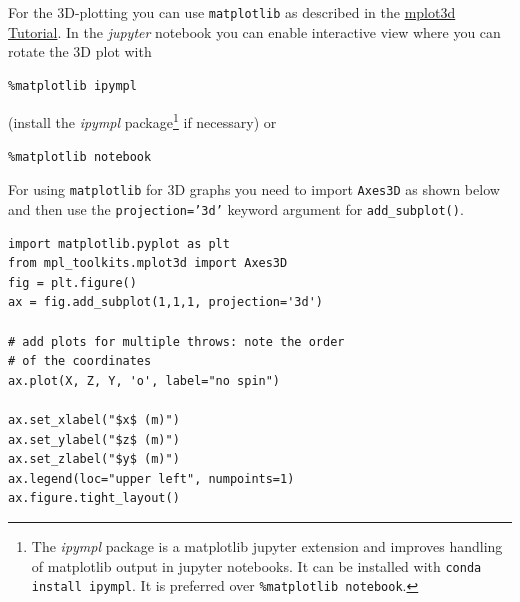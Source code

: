 \documentclass[letterpaper]{scrartcl}
\begin{document}
For the 3D-plotting you can use \texttt{matplotlib} as described in
the
\href{http://matplotlib.org/mpl_toolkits/mplot3d/tutorial.html}{mplot3d
  Tutorial}. In the \emph{jupyter} notebook you can enable
interactive view where you can rotate the 3D plot with
\begin{verbatim}
%matplotlib ipympl
\end{verbatim}
(install the \emph{ipympl} package\footnote{The \emph{ipympl} package
  is a matplotlib jupyter extension and improves handling of
  matplotlib output in jupyter notebooks. It can be installed with
  \texttt{conda install ipympl}. It is preferred over
  \texttt{\%matplotlib notebook}.} if necessary) or
\begin{verbatim}
%matplotlib notebook
\end{verbatim}
For using \texttt{matplotlib} for 3D graphs you need to import
\texttt{Axes3D} as shown below and then use the
\texttt{projection='3d'} keyword argument for \texttt{add\_subplot()}.
\begin{verbatim}
import matplotlib.pyplot as plt
from mpl_toolkits.mplot3d import Axes3D
fig = plt.figure()
ax = fig.add_subplot(1,1,1, projection='3d')

# add plots for multiple throws: note the order
# of the coordinates
ax.plot(X, Z, Y, 'o', label="no spin")

ax.set_xlabel("$x$ (m)")
ax.set_ylabel("$z$ (m)")
ax.set_zlabel("$y$ (m)")
ax.legend(loc="upper left", numpoints=1)
ax.figure.tight_layout()
\end{verbatim}


\end{document}
